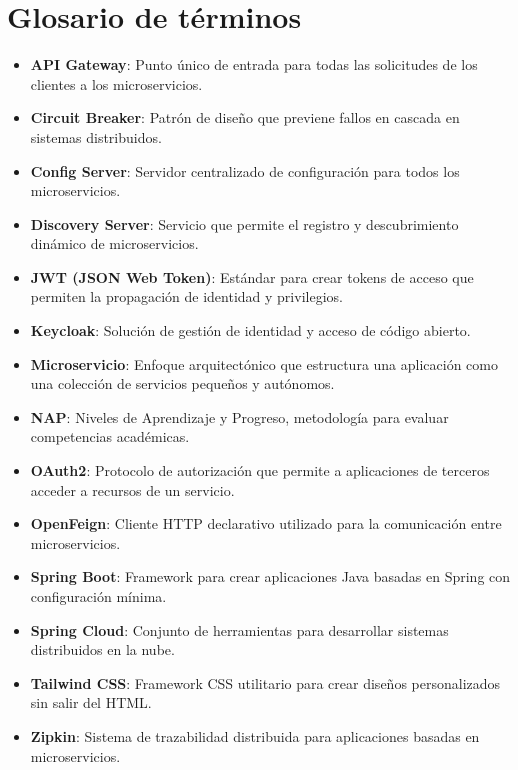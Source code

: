 \documentclass[12pt,a4paper]{report}
\begin{document}
\chapter{Glosario de términos}
\begin{itemize}
    \item \textbf{API Gateway}: Punto único de entrada para todas las solicitudes de los clientes a los microservicios.
    \item \textbf{Circuit Breaker}: Patrón de diseño que previene fallos en cascada en sistemas distribuidos.
    \item \textbf{Config Server}: Servidor centralizado de configuración para todos los microservicios.
    \item \textbf{Discovery Server}: Servicio que permite el registro y descubrimiento dinámico de microservicios.
    \item \textbf{JWT (JSON Web Token)}: Estándar para crear tokens de acceso que permiten la propagación de identidad y privilegios.
    \item \textbf{Keycloak}: Solución de gestión de identidad y acceso de código abierto.
    \item \textbf{Microservicio}: Enfoque arquitectónico que estructura una aplicación como una colección de servicios pequeños y autónomos.
    \item \textbf{NAP}: Niveles de Aprendizaje y Progreso, metodología para evaluar competencias académicas.
    \item \textbf{OAuth2}: Protocolo de autorización que permite a aplicaciones de terceros acceder a recursos de un servicio.
    \item \textbf{OpenFeign}: Cliente HTTP declarativo utilizado para la comunicación entre microservicios.
    \item \textbf{Spring Boot}: Framework para crear aplicaciones Java basadas en Spring con configuración mínima.
    \item \textbf{Spring Cloud}: Conjunto de herramientas para desarrollar sistemas distribuidos en la nube.
    \item \textbf{Tailwind CSS}: Framework CSS utilitario para crear diseños personalizados sin salir del HTML.
    \item \textbf{Zipkin}: Sistema de trazabilidad distribuida para aplicaciones basadas en microservicios.
\end{itemize}
\end{document}
